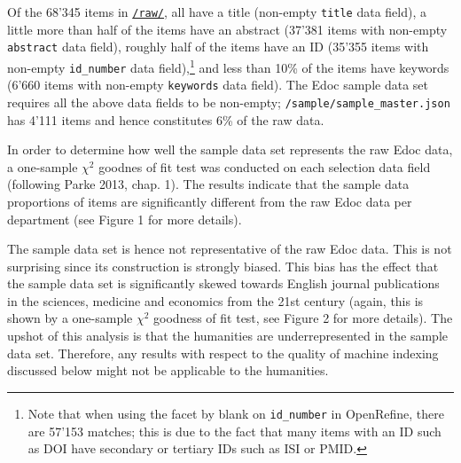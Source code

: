 Of the 68'345 items in
\href{https://github.com/MHindermann/mas/tree/main/files/raw}{\texttt{/raw/}},
all have a title (non-empty \texttt{title} data field), a little more
than half of the items have an abstract (37'381 items with non-empty
\texttt{abstract} data field), roughly half of the items have an ID
(35'355 items with non-empty \texttt{id\_number} data field),\footnote{Note
  that when using the facet by blank on \texttt{id\_number} in
  OpenRefine, there are 57'153 matches; this is due to the fact that
  many items with an ID such as DOI have secondary or tertiary IDs such
  as ISI or PMID.} and less than 10\% of the items have keywords (6'660
items with non-empty \texttt{keywords} data field). The Edoc sample data
set requires all the above data fields to be non-empty;
\texttt{/sample/sample\_master.json} has 4'111 items and hence
constitutes 6\% of the raw data.

In order to determine how well the sample data set represents the raw
Edoc data, a one-sample \(\chi^2\) goodnes of fit test was conducted on
each selection data field (following Parke 2013, chap. 1). The results
indicate that the sample data proportions of items are significantly
different from the raw Edoc data per department (see Figure 1 for more
details).

The sample data set is hence not representative of the raw Edoc data.
This is not surprising since its construction is strongly biased. This
bias has the effect that the sample data set is significantly skewed
towards English journal publications in the sciences, medicine and
economics from the 21st century (again, this is shown by a one-sample
\(\chi^2\) goodness of fit test, see Figure 2 for more details). The
upshot of this analysis is that the humanities are underrepresented in
the sample data set. Therefore, any results with respect to the quality
of machine indexing discussed below might not be applicable to the
humanities.

